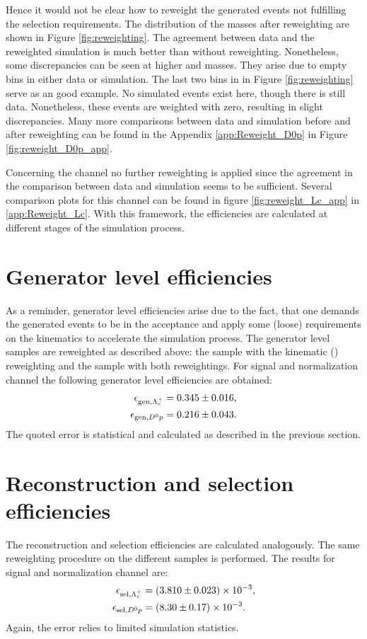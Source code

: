 Hence it would not be clear how to reweight the generated events not fulfilling the selection requirements. 
The distribution of the masses after reweighting are shown in Figure \ref{fig:reweighting}.
The agreement between data and the reweighted simulation is much better than without reweighting.
Nonetheless, some discrepancies can be seen at higher \Dz\mun and \Dz\proton\mun masses.
They arise due to empty bins in either data or simulation.
The last two bins in \MDmu in Figure \ref{fig:reweighting} serve as an good example.
No simulated events exist here, though there is still data.
Nonetheless, these events are weighted with zero, resulting in slight discrepancies.
Many more comparisons between data and simulation before and after reweighting can be found in the Appendix \ref{app:Reweight_D0p} in Figure \ref{fig:reweight_D0p_app}.

Concerning the channel \LbToLcmunu no further reweighting is applied since the agreement in the comparison between data and simulation seems to be sufficient.
Several comparison plots for this channel can be found in figure \ref{fig:reweight_Lc_app} in \ref{app:Reweight_Lc}.
With this framework, the efficiencies are calculated at different stages of the simulation process.

\section{Generator level efficiencies}
As a reminder, generator level efficiencies arise due to the fact, that one demands the generated events to be in the \lhcb acceptance and apply some (loose) requirements on the kinematics to accelerate the simulation process.
The generator level samples are reweighted as described above: the \LbToLcmunu sample with the kinematic \pt(\Lb) reweighting and the \LbToDpmunu sample with both reweightings.
For signal and normalization channel the following generator level efficiencies are obtained:
\begin{align*}
    \effGenLc &= \effGenLcval \pm \effGenLcerr, \\
    \effGenDp &= \effGenDpval \pm \effGenDperr.
\end{align*}
The quoted error is statistical and calculated as described in the previous section.


\section{Reconstruction and selection efficiencies}
The reconstruction and selection efficiencies are calculated analogously.
The same reweighting procedure on the different samples is performed.
The results for signal and normalization channel are:
\begin{align*}
    \effSelLc &= \num[scientific-notation=true]{\effSelLcval \pm \effSelLcerr}, \\
    \effSelDp &= \num[scientific-notation=true]{\effSelDpval \pm \effSelDperr}.
\end{align*}
Again, the error relies to limited simulation statistics.

